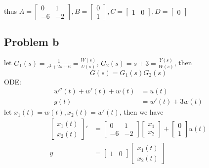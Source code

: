 \documentclass[12pt,a4paper]{article}
\begin{document}
thus
$
    A =
    \begin{bmatrix}
        0  & 1  \\
        -6 & -2
    \end{bmatrix},
    B =
    \begin{bmatrix}
        0 \\
        1
    \end{bmatrix},
    C = \begin{bmatrix}
        1 & 0
    \end{bmatrix},
    D =
    \begin{bmatrix}
        0
    \end{bmatrix}
$

\subsection{Problem b}
let $G_1(s)=\frac{1}{s^2+2s+6}=\frac{W(s)}{U(s)}$, $G_2(s)=s+3=\frac{Y(s)}{W(s)}$, then
\[G(s)  = G_1(s)G_2(s) \]
ODE:
\begin{equation}
    \begin{aligned}
        w''(t) + w'(t) + w(t) & = u(t)    \\
        y(t)            & = w'(t) + 3w(t)
    \end{aligned}
\end{equation}
let $ x_1(t) = w(t), x_2(t) = w'(t)$, then we have
\begin{equation}
    \begin{aligned}
        \begin{bmatrix}
            {x_1(t)} \\
            {x_2(t)}
        \end{bmatrix}' & = \begin{bmatrix}
                               0  & 1  \\
                               -6 & -2
                           \end{bmatrix} \begin{bmatrix}
                                             x_1 \\
                                             x_2
                                         \end{bmatrix} + \begin{bmatrix}
                                                             0 \\
                                                             1
                                                         \end{bmatrix} u(t) \\
        y               & = \begin{bmatrix}
                                1 & 0
                            \end{bmatrix} \begin{bmatrix}
                                              x_1(t) \\
                                              x_2(t)
                                          \end{bmatrix}
    \end{aligned}
\end{equation}
\end{document}

